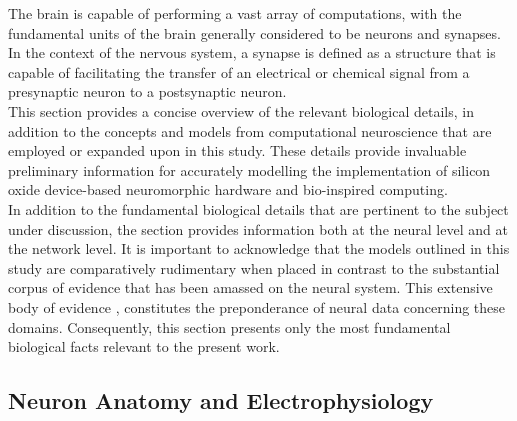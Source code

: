 \noindent The brain is capable of performing a vast array of computations, with the fundamental units of the brain generally considered to be neurons and synapses. In the context of the nervous system, a synapse is defined as a structure that is capable of facilitating the transfer of an electrical or chemical signal from a presynaptic neuron to a postsynaptic neuron. \\



\noindent This section provides a concise overview of the relevant biological details, in addition to the concepts and models from computational neuroscience that are employed or expanded upon in this study. These details provide invaluable preliminary information for accurately modelling the implementation of silicon oxide device-based neuromorphic hardware and bio-inspired computing. \\

\noindent 
In addition to the fundamental biological details that are pertinent to the subject under discussion, the section provides information both at the neural level and at the network level. It is important to acknowledge that the models outlined in this study are comparatively rudimentary when placed in contrast to the substantial corpus of evidence that has been amassed on the neural system. This extensive body of evidence \cite{kandel2000principles}, constitutes the preponderance of neural data concerning these domains. Consequently, this section presents only the most fundamental biological facts relevant to the present work.


\subsection[Neuron Anatomy and Electrophysiology]{Neuron Anatomy and Electrophysiology}

